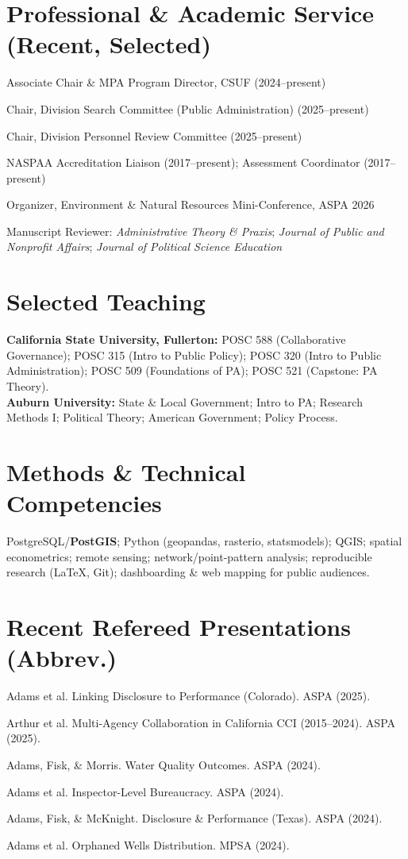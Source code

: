 \documentclass[12pt,letterpaper]{article}
\renewenvironment{itemize}{
  \begin{list}{}{
    \setlength{\leftmargin}{1.2em}
    \setlength{\itemsep}{0.15em}
    \setlength{\parskip}{0pt}
    \setlength{\parsep}{0.15em}
  }
}{
  \end{list}
}
\begin{document}
\section*{Professional \& Academic Service (Recent, Selected)}
\begin{itemize}
  \item Associate Chair \& MPA Program Director, CSUF (2024--present)
  \item Chair, Division Search Committee (Public Administration) (2025--present)
  \item Chair, Division Personnel Review Committee (2025--present)
  \item NASPAA Accreditation Liaison (2017--present); Assessment Coordinator (2017--present)
  \item Organizer, Environment \& Natural Resources Mini-Conference, ASPA 2026
  \item Manuscript Reviewer: \emph{Administrative Theory \& Praxis}; \emph{Journal of Public and Nonprofit Affairs}; \emph{Journal of Political Science Education}
\end{itemize}

\section*{Selected Teaching}
\textbf{California State University, Fullerton:} POSC 588 (Collaborative Governance); POSC 315 (Intro to Public Policy); POSC 320 (Intro to Public Administration); POSC 509 (Foundations of PA); POSC 521 (Capstone: PA Theory).\\
\textbf{Auburn University:} State \& Local Government; Intro to PA; Research Methods I; Political Theory; American Government; Policy Process.

\section*{Methods \& Technical Competencies}
PostgreSQL/\textbf{PostGIS}; Python (geopandas, rasterio, statsmodels); QGIS; spatial econometrics; remote sensing; network/point-pattern analysis; reproducible research (LaTeX, Git); dashboarding \& web mapping for public audiences.

\section*{Recent Refereed Presentations (Abbrev.)}
\begin{itemize}
  \item Adams et al. Linking Disclosure to Performance (Colorado). ASPA (2025).
  \item Arthur et al. Multi-Agency Collaboration in California CCI (2015--2024). ASPA (2025).
  \item Adams, Fisk, \& Morris. Water Quality Outcomes. ASPA (2024).
  \item Adams et al. Inspector-Level Bureaucracy. ASPA (2024).
  \item Adams, Fisk, \& McKnight. Disclosure \& Performance (Texas). ASPA (2024).
  \item Adams et al. Orphaned Wells Distribution. MPSA (2024).
\end{itemize}
\end{document}
